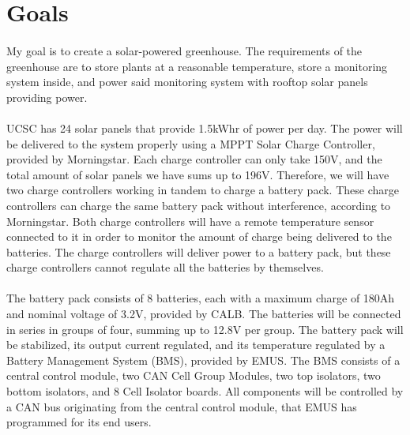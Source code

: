 \section{Goals}

\paragraph{}
My goal is to create a solar-powered greenhouse. The requirements of the greenhouse are to store plants at a reasonable temperature, store a monitoring system inside, and power said monitoring system with rooftop solar panels providing power.
\paragraph{}
UCSC has 24 solar panels that provide 1.5kWhr of power per day. The power will be delivered to the system properly using a MPPT Solar Charge Controller, provided by Morningstar. Each charge controller can only take 150V, and the total amount of solar panels we have sums up to 196V. Therefore, we will have two charge controllers working in tandem to charge a battery pack. These charge controllers can charge the same battery pack without interference, according to Morningstar. Both charge controllers will have a remote temperature sensor connected to it in order to monitor the amount of charge being delivered to the batteries. The charge controllers will deliver power to a battery pack, but these charge controllers cannot regulate all the batteries by themselves.
\paragraph{}
The battery pack consists of 8 batteries, each with a maximum charge of 180Ah and nominal voltage of 3.2V, provided by CALB. The batteries will be connected in series in groups of four, summing up to 12.8V per group. The battery pack will be stabilized, its output current regulated, and its temperature regulated by a Battery Management System (BMS), provided by EMUS. The BMS consists of a central control module, two CAN Cell Group Modules, two top isolators, two bottom isolators, and 8 Cell Isolator boards. All components will be controlled by a CAN bus originating from the central control module, that EMUS has programmed for its end users. 
